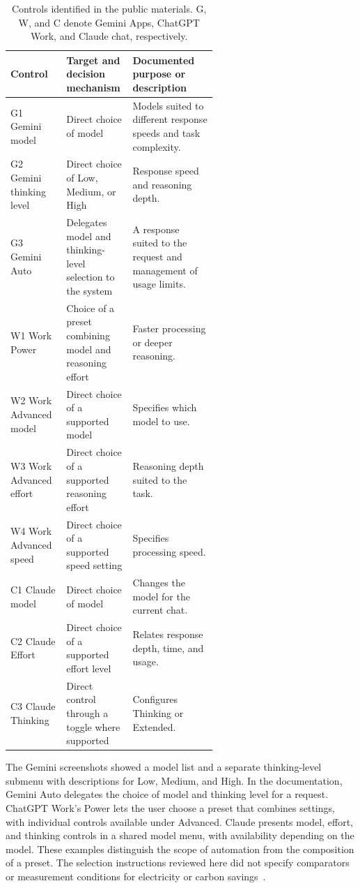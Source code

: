 \documentclass[11pt,letterpaper]{article}
\begin{document}
\begin{table}[H]
\centering
\caption{Controls identified in the public materials. G, W, and C denote
Gemini Apps, ChatGPT Work, and Claude chat, respectively.}
\label{tab:controls}
\small
\begin{tabularx}{\linewidth}{@{}L{0.27\linewidth}L{0.32\linewidth}Y@{}}
\toprule
\textbf{Control} & \textbf{Target and decision mechanism}
& \textbf{Documented purpose or description} \\
\midrule
G1 Gemini model &
Direct choice of model &
Models suited to different response speeds and task complexity. \\
G2 Gemini thinking level &
Direct choice of Low, Medium, or High &
Response speed and reasoning depth. \\
G3 Gemini Auto &
Delegates model and thinking-level selection to the system &
A response suited to the request and management of usage limits. \\
\addlinespace
W1 Work Power &
Choice of a preset combining model and reasoning effort &
Faster processing or deeper reasoning. \\
W2 Work Advanced model &
Direct choice of a supported model &
Specifies which model to use. \\
W3 Work Advanced effort &
Direct choice of a supported reasoning effort &
Reasoning depth suited to the task. \\
W4 Work Advanced speed &
Direct choice of a supported speed setting &
Specifies processing speed. \\
\addlinespace
C1 Claude model &
Direct choice of model &
Changes the model for the current chat. \\
C2 Claude Effort &
Direct choice of a supported effort level &
Relates response depth, time, and usage. \\
C3 Claude Thinking &
Direct control through a toggle where supported &
Configures Thinking or Extended. \\
\bottomrule
\end{tabularx}
\end{table}

The Gemini screenshots showed a model list and a separate thinking-level
submenu with descriptions for Low, Medium, and High. In the
documentation, Gemini Auto delegates the choice of model and thinking
level for a request. ChatGPT Work's Power lets the user choose a preset
that combines settings, with individual controls available under
Advanced. Claude presents model, effort, and thinking controls in a
shared model menu, with availability depending on the model. These
examples distinguish the scope of automation from the composition of
a preset. The selection instructions reviewed here did not specify
comparators or measurement conditions for electricity or carbon
savings~\cite{google2026,openai2026,anthropic2026}.
\end{document}
